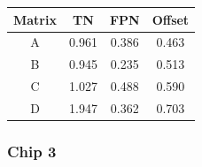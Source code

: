 \documentclass[a4papper, 10pt]{article}
\begin{document}
\begin{itemize}
            \begin{center}
              \begin{tabular}{ c c c c }
                \hline %
         \rowcolor{light-gray}         Matrix  &  TN   &  FPN  &  Offset  \tabularnewline
                \hline %
                \hline %
                    A     & 0.961 & 0.386 & 0.463    \tabularnewline
                \hline %
                    B     & 0.945 & 0.235 & 0.513   \tabularnewline
                \hline %
                    C     & 1.027 & 0.488 & 0.590   \tabularnewline
                \hline %
                    D     & 1.947 & 0.362 & 0.703    \tabularnewline
                \hline %
              \end{tabular}
            \end{center}
    \end{itemize}

    \subsubsection{Chip 3}
    
\end{document}
